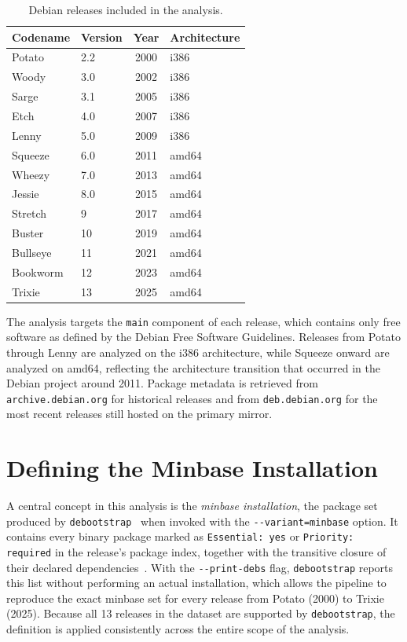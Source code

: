 \begin{table}[ht]
  \centering
  \caption{Debian releases included in the analysis.}
  \label{tab:releases}
  \begin{tabular}{llcl}
    \hline
    Codename & Version & Year & Architecture \\
    \hline
    Potato   & 2.2  & 2000 & i386  \\
    Woody    & 3.0  & 2002 & i386  \\
    Sarge    & 3.1  & 2005 & i386  \\
    Etch     & 4.0  & 2007 & i386  \\
    Lenny    & 5.0  & 2009 & i386  \\
    Squeeze  & 6.0  & 2011 & amd64 \\
    Wheezy   & 7.0  & 2013 & amd64 \\
    Jessie   & 8.0  & 2015 & amd64 \\
    Stretch  & 9    & 2017 & amd64 \\
    Buster   & 10   & 2019 & amd64 \\
    Bullseye & 11   & 2021 & amd64 \\
    Bookworm & 12   & 2023 & amd64 \\
    Trixie   & 13   & 2025 & amd64 \\
    \hline
  \end{tabular}
\end{table}

The analysis targets the \texttt{main} component of each release, which contains only free software as defined by the Debian Free Software Guidelines. Releases from Potato through Lenny are analyzed on the i386 architecture, while Squeeze onward are analyzed on amd64, reflecting the architecture transition that occurred in the Debian project around 2011. Package metadata is retrieved from \texttt{archive.debian.org} for historical releases and from \texttt{deb.debian.org} for the most recent releases still hosted on the primary mirror.

\section{Defining the Minbase Installation}
\label{sec:minbase}

A central concept in this analysis is the \emph{minbase installation}, the package set produced by \texttt{debootstrap}~\cite{debootstrap} when invoked with the \texttt{-{}-variant=minbase} option. It contains every binary package marked as \texttt{Essential: yes} or \texttt{Priority: required} in the release's package index, together with the transitive closure of their declared dependencies~\cite{debianPolicy}. With the \texttt{-{}-print-debs} flag, \texttt{debootstrap} reports this list without performing an actual installation, which allows the pipeline to reproduce the exact minbase set for every release from Potato (2000) to Trixie (2025). Because all 13 releases in the dataset are supported by \texttt{debootstrap}, the definition is applied consistently across the entire scope of the analysis.

